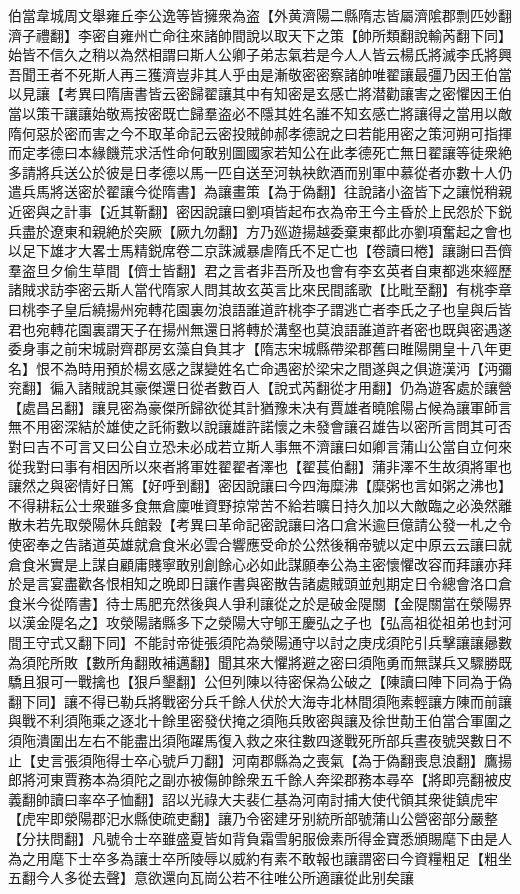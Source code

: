 伯當韋城周文舉雍丘李公逸等皆擁衆為盗【外黄濟陽二縣隋志皆屬濟隂郡剽匹妙翻濟子禮翻】李密自雍州亡命往來諸帥間說以取天下之策【帥所類翻說輸芮翻下同】始皆不信久之稍以為然相謂曰斯人公卿子弟志氣若是今人人皆云楊氏將滅李氏將興吾聞王者不死斯人再三獲濟豈非其人乎由是漸敬密密察諸帥唯翟讓最彊乃因王伯當以見讓【考異曰隋唐書皆云密歸翟讓其中有知密是玄感亡將潜勸讓害之密懼因王伯當以策干讓讓始敬焉按密既亡歸羣盗必不隱其姓名誰不知玄感亡將讓得之當用以敵隋何惡於密而害之今不取革命記云密投賊帥郝孝德說之曰若能用密之策河朔可指揮而定孝德曰本緣饑荒求活性命何敢别圖國家若知公在此孝德死亡無日翟讓等徒衆絶多請將兵送公於彼是日孝德以馬一匹自送至河執袂飲酒而别軍中慕從者亦數十人仍遣兵馬將送密於翟讓今從隋書】為讓畫策【為于偽翻】往說諸小盗皆下之讓悦稍親近密與之計事【近其靳翻】密因說讓曰劉項皆起布衣為帝王今主昏於上民怨於下鋭兵盡於遼東和親絶於突厥【厥九勿翻】方乃廵遊揚越委棄東都此亦劉項奮起之會也以足下雄才大畧士馬精鋭席卷二京誅滅暴虐隋氏不足亡也【卷讀曰棬】讓謝曰吾儕羣盗旦夕偷生草間【儕士皆翻】君之言者非吾所及也會有李玄英者自東都逃來經歷諸賊求訪李密云斯人當代隋家人問其故玄英言比來民間謠歌【比毗至翻】有桃李章曰桃李子皇后繞揚州宛轉花園裏勿浪語誰道許桃李子謂逃亡者李氏之子也皇與后皆君也宛轉花園裏謂天子在揚州無還日將轉於溝壑也莫浪語誰道許者密也既與密遇遂委身事之前宋城尉齊郡房玄藻自負其才【隋志宋城縣帶梁郡舊曰睢陽開皇十八年更名】恨不為時用預於楊玄感之謀變姓名亡命遇密於梁宋之間遂與之俱遊漢沔【沔彌兖翻】徧入諸賊說其豪傑還日從者數百人【說式芮翻從才用翻】仍為遊客處於讓營【處昌呂翻】讓見密為豪傑所歸欲從其計猶豫未决有賈雄者曉隂陽占候為讓軍師言無不用密深結於雄使之託術數以說讓雄許諾懷之未發會讓召雄告以密所言問其可否對曰吉不可言又曰公自立恐未必成若立斯人事無不濟讓曰如卿言蒲山公當自立何來從我對曰事有相因所以來者將軍姓翟翟者澤也【翟萇伯翻】蒲非澤不生故須將軍也讓然之與密情好日篤【好呼到翻】密因說讓曰今四海糜沸【糜粥也言如粥之沸也】不得耕耘公士衆雖多食無倉廩唯資野掠常苦不給若曠日持久加以大敵臨之必渙然離散未若先取滎陽休兵館穀【考異曰革命記密說讓曰洛口倉米逾巨億請公發一札之令使密奉之告諸道英雄就倉食米必雲合響應受命於公然後稱帝號以定中原云云讓曰就倉食米實是上謀自顧庸賤寧敢别創餘心必如此謀願奉公為主密懷懼改容而拜讓亦拜於是言宴盡歡各恨相知之晩即日讓作書與密散告諸處賊頭並剋期定日令總會洛口倉食米今從隋書】待士馬肥充然後與人爭利讓從之於是破金隄關【金隄關當在滎陽界以漢金隄名之】攻滎陽諸縣多下之滎陽大守郇王慶弘之子也【弘高祖從祖弟也封河間王守式又翻下同】不能討帝徙張須陀為滎陽通守以討之庚戌須陀引兵擊讓讓曏數為須陀所敗【數所角翻敗補邁翻】聞其來大懼將避之密曰須陁勇而無謀兵又驟勝既驕且狠可一戰擒也【狠戶墾翻】公但列陳以待密保為公破之【陳讀曰陣下同為于偽翻下同】讓不得已勒兵將戰密分兵千餘人伏於大海寺北林間須陁素輕讓方陳而前讓與戰不利須陁乘之逐北十餘里密發伏掩之須陁兵敗密與讓及徐世勣王伯當合軍圍之須陁潰圍出左右不能盡出須陁躍馬復入救之來往數四遂戰死所部兵晝夜號哭數日不止【史言張須陁得士卒心號戶刀翻】河南郡縣為之喪氣【為于偽翻喪息浪翻】鷹揚郎將河東賈務本為須陀之副亦被傷帥餘衆五千餘人奔梁郡務本尋卒【將即亮翻被皮義翻帥讀曰率卒子恤翻】詔以光祿大夫裴仁基為河南討捕大使代領其衆徙鎮虎牢【虎牢即滎陽郡汜水縣使疏吏翻】讓乃令密建牙别統所部號蒲山公營密部分嚴整【分扶問翻】凡號令士卒雖盛夏皆如背負霜雪躬服儉素所得金寶悉頒賜麾下由是人為之用麾下士卒多為讓士卒所陵辱以威約有素不敢報也讓謂密曰今資糧粗足【粗坐五翻今人多從去聲】意欲還向瓦崗公若不往唯公所適讓從此别矣讓